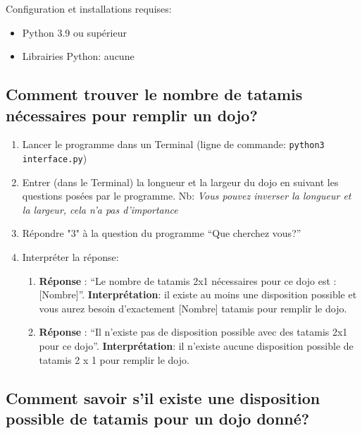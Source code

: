 Configuration et installations requises:

\begin{itemize}
    \item Python 3.9 ou supérieur
    \item Librairies Python: aucune
\end{itemize}

\subsection{Comment trouver le nombre de tatamis nécessaires pour remplir un dojo?}

\begin{enumerate}
    \item Lancer le programme dans un Terminal (ligne de commande: \texttt{python3 interface.py})
    \item Entrer (dans le Terminal) la longueur et la largeur du dojo en suivant les questions posées par
          le programme. Nb: \textit{Vous pouvez inverser la longueur et la largeur, cela n’a pas d’importance}
    \item Répondre "3" à la question du programme “Que cherchez vous?”
    \item Interpréter la réponse:
          \begin{enumerate}
              \item \textbf{Réponse} : “Le nombre de tatamis 2x1 nécessaires pour ce dojo est : [Nombre]”.
                    \textbf{Interprétation}: il existe au moins une disposition possible et vous aurez besoin
                    d’exactement [Nombre] tatamis pour remplir le dojo.
              \item \textbf{Réponse} : “Il n'existe pas de disposition possible avec des tatamis 2x1 pour ce dojo”.
                    \textbf{Interprétation}: il n’existe aucune disposition possible de tatamis 2 x 1 pour remplir le dojo.
          \end{enumerate}
\end{enumerate}


\subsection{Comment savoir s’il existe une disposition possible de tatamis pour un dojo donné?}

